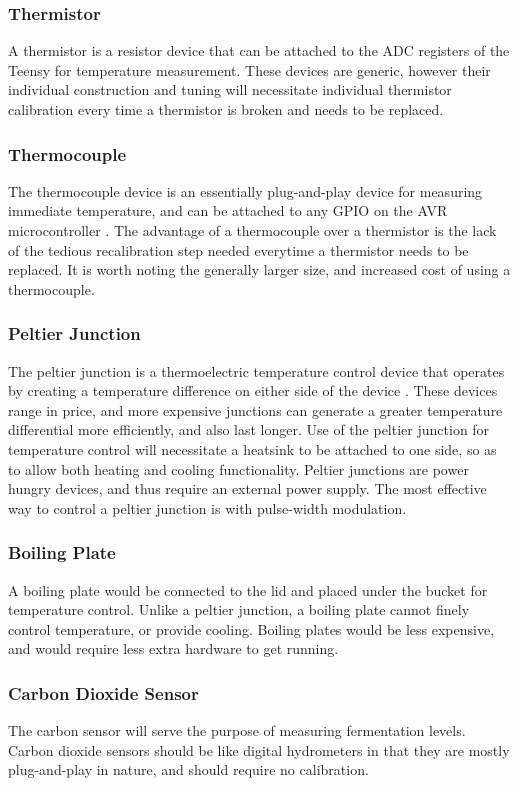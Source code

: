 \subsubsection{Thermistor}
A thermistor is a resistor device that can be attached to the ADC registers of the Teensy for temperature measurement.
These devices are generic, however their individual construction and tuning will necessitate individual thermistor calibration every time a thermistor
	is broken and needs to be replaced.
\subsubsection{Thermocouple}
The thermocouple device is an essentially plug-and-play device for measuring immediate temperature, and can be attached to 
	any GPIO on the AVR microcontroller \cite{thermocouple}. 
The advantage of a thermocouple over a thermistor is the lack of the tedious recalibration step needed everytime a thermistor 
	needs to be replaced. 
It is worth noting the generally larger size, and increased cost of using a thermocouple.
\subsubsection{Peltier Junction}
The peltier junction is a thermoelectric temperature control device that operates by creating a temperature difference on either side of the 
	device \cite{peltier}.
These devices range in price, and more expensive junctions can generate a greater temperature differential more efficiently, and also last longer.
Use of the peltier junction for temperature control will necessitate a heatsink to be attached to one side, so as to allow both heating and cooling 
	functionality.
Peltier junctions are power hungry devices, and thus require an external power supply.
The most effective way to control a peltier junction is with pulse-width modulation.
\subsubsection{Boiling Plate}
A boiling plate would be connected to the lid and placed under the bucket for temperature control.
Unlike a peltier junction, a boiling plate cannot finely control temperature, or provide cooling.
Boiling plates would be less expensive, and would require less extra hardware to get running.
\subsubsection{Carbon Dioxide Sensor}
The carbon sensor will serve the purpose of measuring fermentation levels.
Carbon dioxide sensors should be like digital hydrometers in that they are mostly plug-and-play in nature, and should require no calibration.

